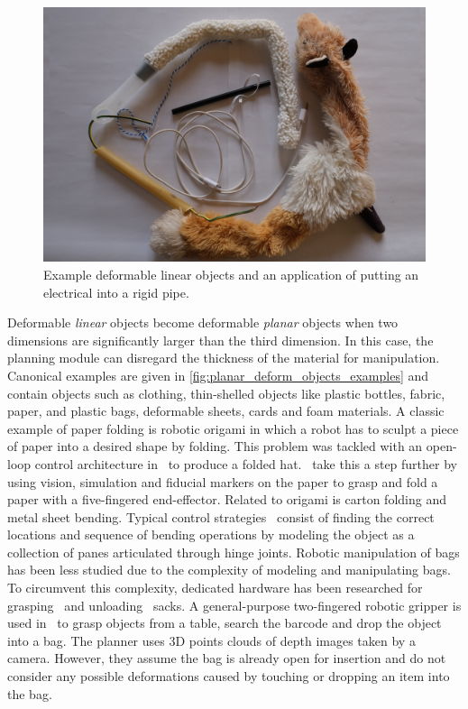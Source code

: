 \begin{figure}[htbp!]
    \centering
    \includegraphics[keepaspectratio,width=\textwidth]{figures/fig_dlos.JPG}
    \caption{Example deformable linear objects and an application of putting an electrical into a rigid pipe.}
    \label{fig:dlo_examples}
\end{figure}

Deformable \textit{linear} objects become deformable \textit{planar} objects when two dimensions are significantly larger than the third dimension. In this case, the planning module can disregard the thickness of the material for manipulation. Canonical examples are given in \cref{fig:planar_deform_objects_examples} and contain objects such as clothing, thin-shelled objects like plastic bottles, fabric, paper, and plastic bags, deformable sheets, cards and foam materials. A classic example of paper folding is robotic origami in which a robot has to sculpt a piece of paper into a desired shape by folding. This problem was tackled with an open-loop control architecture in~\autocite{Balkcom2008} to produce a folded hat.~\Textcite{Elbrechter2012} take this a step further by using vision, simulation and fiducial markers on the paper to grasp and fold a paper with a five-fingered end-effector. Related to origami is carton folding and metal sheet bending. Typical control strategies~\autocite{Liang1999,Liu2003,Aomura2002} consist of finding the correct locations and sequence of bending operations by modeling the object as a collection of panes articulated through hinge joints. Robotic manipulation of bags has been less studied due to the complexity of modeling and manipulating bags. To circumvent this complexity, dedicated hardware has been researched for grasping~\autocite{Kazerooni2005} and unloading~\autocite{Kirchheim2008} sacks. A general-purpose two-fingered robotic gripper is used in~\autocite{Klingbeil2011} to grasp objects from a table, search the barcode and drop the object into a bag. The planner uses 3D points clouds of depth images taken by a camera. However, they assume the bag is already open for insertion and do not consider any possible deformations caused by touching or dropping an item into the bag.


